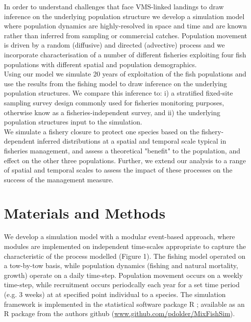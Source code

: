 \documentclass[review]{elsarticle}
\begin{document}
In order to understand challenges that face VMS-linked landings to draw
inference on the underlying population structure we develop a simulation model
where population dynamics are highly-resolved in space and time and are known
rather than inferred from sampling or commercial catches. Population movement
is driven by a random (diffusive) and directed (advective) process and we
incorporate characterisation of a number of different fisheries exploiting four
fish populations with different spatial and population demographics.\\

Using our model we simulate 20 years of exploitation of the fish populations
and use the results from the fishing model to draw inference on the underlying
population structures.  We compare this inference to: i) a stratified
fixed-site sampling survey design commonly used for fisheries monitoring
purposes, otherwise know as a fisheries-independent
	survey, and ii) the underlying population structures input to the
simulation.\\

We simulate a fishery closure to protect one species based on the
fishery-dependent inferred distributions at a spatial and temporal scale
typical in fisheries management, and assess a theoretical "benefit" to the
population, and effect on the other three populations. Further, we extend our
analysis to a range of spatial and temporal scales to assess the impact of
these processes on the success of the management measure. \\

\section{Materials and Methods}

%
We develop a simulation model with a modular event-based approach, where
modules are implemented on independent time-scales appropriate to capture the
characteristic of the process modelled (Figure 1). The fishing model operated on a
tow-by-tow basis, while population dynamics (fishing and natural mortality,
growth) operate on a daily time-step.  Population movement occurs on a
weekly time-step, while recruitment occurs periodcally each year for a set
time period (e.g. 3 weeks) at at specified point individual to a species. The
simulation framework is implemented in the statistical software package R
\citep{RCoreTeam2017}; available as an R package from the authors github
(\url{www.github.com/pdolder/MixFishSim}).\\
\end{document}
